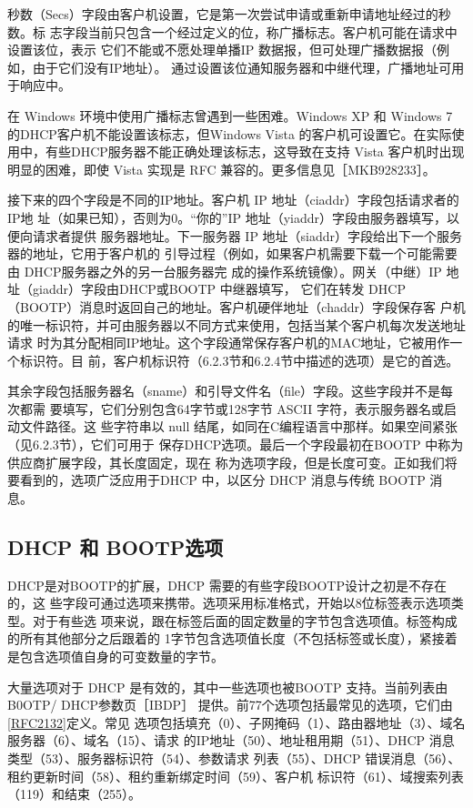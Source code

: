 秒数（Secs）字段由客户机设置，它是第一次尝试申请或重新申请地址经过的秒数。标
志字段当前只包含一个经过定义的位，称广播标志。客户机可能在请求中设置该位，表示
它们不能或不愿处理单播IP 数据报，但可处理广播数据报（例如，由于它们没有IP地址）。
通过设置该位通知服务器和中继代理，广播地址可用于响应中。

\begin{tcolorbox}
    在 Windows 环境中使用广播标志曾遇到一些困难。Windows XP 和 Windows 7
    的DHCP客户机不能设置该标志，但Windows Vista 的客户机可设置它。在实际使
    用中，有些DHCP服务器不能正确处理该标志，这导致在支持 Vista 客户机时出现
    明显的困难，即使 Vista 实现是 RFC 兼容的。更多信息见［MKB928233］。
\end{tcolorbox}

接下来的四个字段是不同的IP地址。客户机 IP 地址（ciaddr）字段包括请求者的IP地
址（如果已知），否则为0。“你的”IP 地址（yiaddr）字段由服务器填写，以便向请求者提供
服务器地址。下一服务器 IP 地址（siaddr）字段给出下一个服务器的地址，它用于客户机的
引导过程（例如，如果客户机需要下载一个可能需要由 DHCP服务器之外的另一台服务器完
成的操作系统镜像）。网关（中继）IP 地址（giaddr）字段由DHCP或BOOTP 中继器填写，
它们在转发 DHCP（BOOTP）消息时返回自己的地址。客户机硬伴地址（chaddr）字段保存客
户机的唯一标识符，并可由服务器以不同方式来使用，包括当某个客户机每次发送地址请求
时为其分配相同IP地址。这个字段通常保存客户机的MAC地址，它被用作一个标识符。目
前，客户机标识符（6.2.3节和6.2.4节中描述的选项）是它的首选。

其余字段包括服务器名（sname）和引导文件名（file）字段。这些字段并不是每次都需
要填写，它们分别包含64字节或128字节 ASCII 字符，表示服务器名或启动文件路径。这
些字符串以 null 结尾，如同在C编程语言中那样。如果空间紧张（见6.2.3节），它们可用于
保存DHCP选项。最后一个字段最初在BOOTP 中称为供应商扩展字段，其长度固定，现在
称为选项字段，但是长度可变。正如我们将要看到的，选项广泛应用于DHCP 中，以区分
DHCP 消息与传统 BOOTP 消息。

\subsection{DHCP 和 BOOTP选项}
DHCP是对BOOTP的扩展，DHCP 需要的有些字段BOOTP设计之初是不存在的，这
些字段可通过选项来携带。选项采用标准格式，开始以8位标签表示选项类型。对于有些选
项来说，跟在标签后面的固定数量的字节包含选项值。标签构成的所有其他部分之后跟着的
1字节包含选项值长度（不包括标签或长度），紧接着是包含选项值自身的可变数量的字节。

大量选项对于 DHCP 是有效的，其中一些选项也被BOOTP 支持。当前列表由B0OTP/
DHCP参数页［IBDP］ 提供。前77个选项包括最常见的选项，它们由\href{https://www.rfc-editor.org/rfc/rfc2132}{\href{https://www.rfc-editor.org/rfc/rfc2132}{[RFC2132]}}定义。常见
选项包括填充（0）、子网掩码（1）、路由器地址（3）、域名服务器（6）、域名（15）、请求
的IP地址（50）、地址租用期（51）、DHCP 消息类型（53）、服务器标识符（54）、参数请求
列表（55）、DHCP 错误消息（56）、租约更新时间（58）、租约重新绑定时间（59）、客户机
标识符（61）、域搜索列表（119）和结束（255）。

